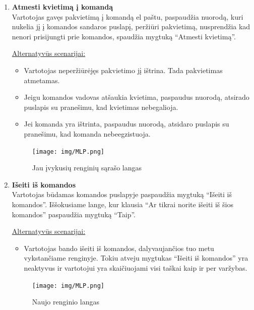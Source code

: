 \documentclass{VUMIFPSkursinis}
\begin{document}
\begin{enumerate} [label = \textbf{U\arabic*.}]
				\begin{figure}[H]
					\centering
					\texttt{[image: img/MLP.png]}
					\caption{Atsiliepimo apie renginį langas}
					\label{fig:rasyti-atsiliepima-apie-rengini}
				\end{figure}

			\item \textbf{Atmesti kvietimą į komandą} \\
				Vartotojas gavęs pakvietimą į komandą el paštu, paspaudžia nuorodą, kuri nukelia jį į komandos sandaros puslapį, peržiūri pakvietimą, nusprendžia kad nenori prisijungti prie komandos, spaudžia mygtuką “Atmesti kvietimą”.

				\underline{Alternatyvūs scenarijai:}
				\begin{itemize}
					\item Vartotojas neperžiūrėjęs pakvietimo jį ištrina. Tada pakvietimas atmetamas.
					\item Jeigu komandos vadovas atšaukia kvietima, paspaudus nuorodą, atsirado puslapis su pranešimu, kad kvietimas nebegalioja.
					\item Jei komanda yra ištrinta, paspaudus nuorodą, atsidaro puslapis su pranešimu, kad komanda nebeegzistuoja.
				\end{itemize}

				\begin{figure}[H]
					\centering
					\texttt{[image: img/MLP.png]}
					\caption{Jau įvykusių renginių sąrašo langas}
					\label{fig:matyti-jau-ivykusius-renginius}
				\end{figure}
			
			\item \textbf{Išeiti iš komandos} \\
				Vartotojas būdamas komandos puslapyje paspaudžia mygtuką “Išeiti iš komandos”. Iššokusiame lange, kur klausia “Ar tikrai norite išeiti iš šios komandos” paspaudžia mygtuką “Taip”.
				
				\underline{Alternatyvūs scenarijai:}
				\begin{itemize}
					\item Vartotojas bando išeiti iš komandos, dalyvaujančios tuo metu vykstančiame renginyje. Tokiu atveju mygtukas  “Išeiti iš komandos” yra neaktyvus ir vartotojui yra skaičiuojami visi taškai kaip ir per varžybas.
				\end{itemize}
				
				\begin{figure}[H]
					\centering
					\texttt{[image: img/MLP.png]}
					\caption{Naujo renginio langas}
					\label{fig:paskelbti-nauja-rengini}
				\end{figure}


\end{enumerate}
\end{document}
